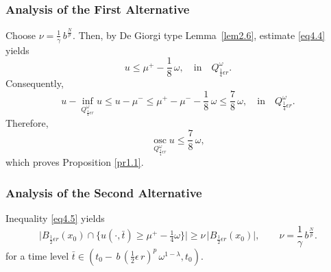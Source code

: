 \documentclass[a4paper,11pt,fullpage]{article}
\DeclareMathOperator*{\osc}{osc}
\numberwithin{equation}{section}
\begin{document}
\subsubsection{Analysis of the First Alternative}
Choose $\nu=\frac{1}{\gamma}\,b^{\frac{N}{p}}$. Then, by  De Giorgi type Lemma~\ref{lem2.6}, estimate \eqref{eq4.4} yields
$$u\leqslant \mu^+-\frac{1}{8}\,\omega,\quad \text{in}\quad Q^{\omega}_{\frac{1}{4} \epsilon r}.$$
Consequently,
$$u-\inf\limits_{Q^{\omega}_{\frac{1}{4}\epsilon r }}u\leqslant u-\mu^-\leqslant \mu^+-\mu^--\frac{1}{8}\,\omega\leqslant\frac{7}{8}\,\omega,\quad \text{in}\quad Q^{\omega}_{\frac{1}{4} \epsilon r}.$$
Therefore,
\begin{equation}\label{eq4.6}
\osc\limits_{Q^{\omega}_{\frac{1}{4}\epsilon r }} u \leqslant \frac{7}{8}\,\omega,
\end{equation}
which proves Proposition \ref{pr1.1}.

\subsubsection{Analysis of the Second Alternative}

Inequality \eqref{eq4.5} yields
\begin{equation}\label{eq4.5*}
\bigl|B_{\frac{1}{2}\epsilon r}(x_0)\cap\{u(\cdot,\bar{t})\geqslant \mu^{+}-\tfrac{1}{4}\omega\}\bigr|\geqslant\nu\,\bigl|B_{\frac{1}{2}\epsilon r}(x_0)\bigr|,
\qquad\nu=\frac{1}{\gamma}\,b^{\frac{N}{p}}.
\end{equation}
for a time level $\bar{t}\in (t_0- \,b\,(\frac{1}{2}\epsilon \,r)^{p}\,\omega^{1-\lambda}, t_0)$.
\end{document}
